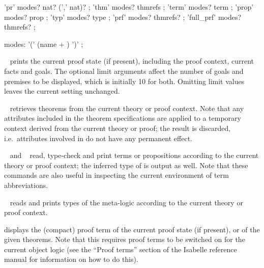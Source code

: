 \begin{isabellebody}
\begin{isamarkuptext}
  \begin{rail}
    'pr' modes? nat? (',' nat)?
    ;
    'thm' modes? thmrefs
    ;
    'term' modes? term
    ;
    'prop' modes? prop
    ;
    'typ' modes? type
    ;
    'prf' modes? thmrefs?
    ;
    'full\_prf' modes? thmrefs?
    ;

    modes: '(' (name + ) ')'
    ;
  \end{rail}

  \begin{descr}

  \item [\hyperlink{command.pr}{\mbox{\isa{\isacommand{pr}}}}~\isa{{\isachardoublequote}goals{\isacharcomma}\ prems{\isachardoublequote}}] prints the current
  proof state (if present), including the proof context, current facts
  and goals.  The optional limit arguments affect the number of goals
  and premises to be displayed, which is initially 10 for both.
  Omitting limit values leaves the current setting unchanged.

  \item [\hyperlink{command.thm}{\mbox{\isa{\isacommand{thm}}}}~\isa{{\isachardoublequote}a\isactrlsub {\isadigit{1}}\ {\isasymdots}\ a\isactrlsub n{\isachardoublequote}}] retrieves
  theorems from the current theory or proof context.  Note that any
  attributes included in the theorem specifications are applied to a
  temporary context derived from the current theory or proof; the
  result is discarded, i.e.\ attributes involved in  do not have any permanent effect.

  \item [\hyperlink{command.term}{\mbox{\isa{\isacommand{term}}}}~\isa{t} and \hyperlink{command.prop}{\mbox{\isa{\isacommand{prop}}}}~\isa{{\isasymphi}}]
  read, type-check and print terms or propositions according to the
  current theory or proof context; the inferred type of  is
  output as well.  Note that these commands are also useful in
  inspecting the current environment of term abbreviations.

  \item [\hyperlink{command.typ}{\mbox{\isa{\isacommand{typ}}}}~\isa{{\isasymtau}}] reads and prints types of the
  meta-logic according to the current theory or proof context.

  \item [\hyperlink{command.prf}{\mbox{\isa{\isacommand{prf}}}}] displays the (compact) proof term of the
  current proof state (if present), or of the given theorems. Note
  that this requires proof terms to be switched on for the current
  object logic (see the ``Proof terms'' section of the Isabelle
  reference manual for information on how to do this).


\end{descr}
\end{isamarkuptext}
\end{isabellebody}
